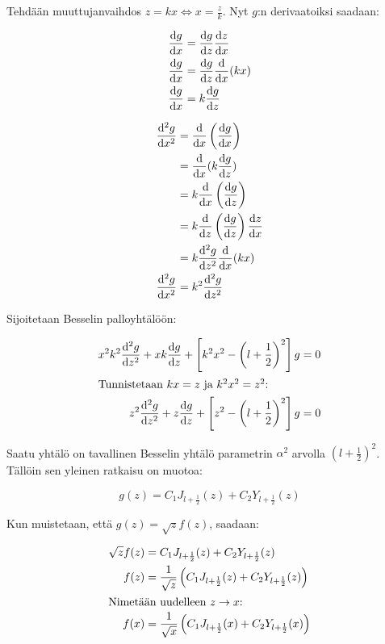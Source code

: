 \documentclass[../johdoksia.tex]{subfiles}
\begin{document}
	Tehdään muuttujanvaihdos $z = kx \iff x = \frac{z}{k}$. Nyt $g$:n derivaatoiksi saadaan:
	
	\begin{align*}
		\odv{g}{x} &= \odv{g}{z}\odv{z}{x} \\
		\odv{g}{x} &= \odv{g}{z}\odv{}{x}(kx) \\
		\odv{g}{x} &= k\odv{g}{z}
	\end{align*} 

	\begin{align}
		\odv{^2g}{x^2} &= \odv{}{x}\left(\odv{g}{x}\right) \\
		&= \odv{}{x}(k\odv{g}{z}) \\
		&= k\odv{}{x}\left(\odv{g}{z}\right) \\
		&= k\odv{}{z}\left(\odv{g}{z}\right)\odv{z}{x} \\
		&= k\odv{^2g}{z^2}\odv{}{x}(kx) \\
		\odv{^2g}{x^2} &= k^2\odv{^2g}{z^2}
	\end{align}

	Sijoitetaan Besselin palloyhtälöön:
	
	\begin{align*}
		x^2k^2\odv{^2g}{z^2} + xk\odv{g}{z} + \left[k^2x^2 - \left(l + \frac{1}{2}\right)^2\right]g &= 0 \\
		\intertext{Tunnistetaan $kx = z$ ja $k^2x^2 = z^2$:}
		z^2\odv{^2g}{z^2} + z\odv{g}{z} + \left[z^2 - \left(l + \frac{1}{2}\right)^2\right]g &= 0
	\end{align*}

	Saatu yhtälö on tavallinen Besselin yhtälö parametrin $\alpha^2$ arvolla $\left(l + \frac{1}{2}\right)^2$. Tällöin sen yleinen ratkaisu on muotoa:
	
	\begin{equation*}
		g(z) = C_1J_{l + \frac{1}{2}}(z) + C_2Y_{l + \frac{1}{2}}(z)
	\end{equation*}

	Kun muistetaan, että $g(z) = \sqrt{z}f(z)$, saadaan:
	
	\begin{align*}
		\sqrt{z}f(z) &= C_1J_{l + \frac{1}{2}}(z) + C_2Y_{l + \frac{1}{2}}(z) \\
		f(z) &= \frac{1}{\sqrt{z}}\left(C_1J_{l + \frac{1}{2}}(z) + C_2Y_{l + \frac{1}{2}}(z)\right) \\
		\intertext{Nimetään uudelleen $z \to x$:}
		f(x) &= \frac{1}{\sqrt{x}}\left(C_1J_{l + \frac{1}{2}}(x) + C_2Y_{l + \frac{1}{2}}(x)\right)
	\end{align*}
\end{document}
